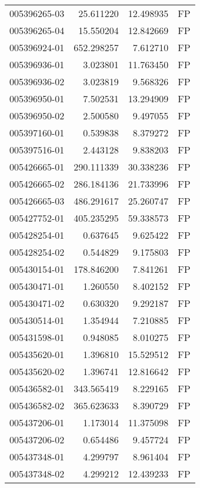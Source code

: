 \begin{tabular}{lrrl}
005396265-03 &   25.611220 &      12.498935 &   FP \\
005396265-04 &   15.550204 &      12.842669 &   FP \\
005396924-01 &  652.298257 &       7.612710 &   FP \\
005396936-01 &    3.023801 &      11.763450 &   FP \\
005396936-02 &    3.023819 &       9.568326 &   FP \\
005396950-01 &    7.502531 &      13.294909 &   FP \\
005396950-02 &    2.500580 &       9.497055 &   FP \\
005397160-01 &    0.539838 &       8.379272 &   FP \\
005397516-01 &    2.443128 &       9.838203 &   FP \\
005426665-01 &  290.111339 &      30.338236 &   FP \\
005426665-02 &  286.184136 &      21.733996 &   FP \\
005426665-03 &  486.291617 &      25.260747 &   FP \\
005427752-01 &  405.235295 &      59.338573 &   FP \\
005428254-01 &    0.637645 &       9.625422 &   FP \\
005428254-02 &    0.544829 &       9.175803 &   FP \\
005430154-01 &  178.846200 &       7.841261 &   FP \\
005430471-01 &    1.260550 &       8.402152 &   FP \\
005430471-02 &    0.630320 &       9.292187 &   FP \\
005430514-01 &    1.354944 &       7.210885 &   FP \\
005431598-01 &    0.948085 &       8.010275 &   FP \\
005435620-01 &    1.396810 &      15.529512 &   FP \\
005435620-02 &    1.396741 &      12.816642 &   FP \\
005436582-01 &  343.565419 &       8.229165 &   FP \\
005436582-02 &  365.623633 &       8.390729 &   FP \\
005437206-01 &    1.173014 &      11.375098 &   FP \\
005437206-02 &    0.654486 &       9.457724 &   FP \\
005437348-01 &    4.299797 &       8.961404 &   FP \\
005437348-02 &    4.299212 &      12.439233 &   FP \\

\end{tabular}
